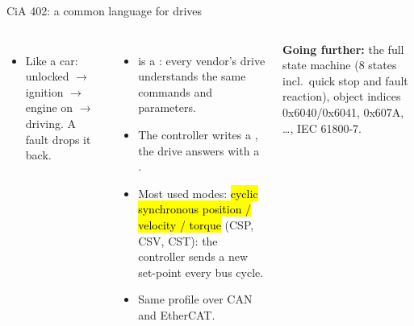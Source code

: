 \documentclass[aspectratio=169,10pt]{beamer}
\newcommand{\gofurther}[1]{{\footnotesize\color{mkGray}\textbf{\color{mkMid}Going further:} #1}}
\begin{document}
\begin{frame}{CiA 402: a common language for drives}
\begin{columns}[T]
\centering
{}
\begin{itemize}\small
\item Like a car: unlocked $\to$ ignition $\to$ engine on $\to$ driving. A fault drops it back.
\end{itemize}
\begin{itemize}\small
\item {} is a : every vendor's drive understands the same commands and parameters.
\item The controller writes a , the drive answers with a .
\item Most used modes: \hl{cyclic synchronous position / velocity / torque} (CSP, CSV, CST): the controller sends a new set-point every bus cycle.
\item Same profile over CAN and EtherCAT.
\end{itemize}
\gofurther{the full state machine (8 states incl.\ quick stop and fault reaction), object indices 0x6040/0x6041, 0x607A, \dots, IEC 61800-7.}
\end{columns}
\end{frame}
\end{document}
